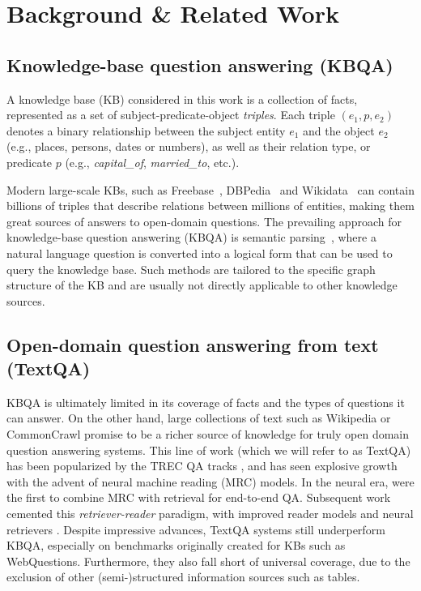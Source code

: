 \documentclass[11pt]{article}
\begin{document}
 
\section{Background \& Related Work}

\subsection{Knowledge-base question answering (KBQA)}

A knowledge base (KB) considered in this work is a collection of facts, represented as a set of subject-predicate-object \emph{triples}.
Each triple $(e_1, p, e_2)$ denotes a binary relationship between the subject entity $e_1$ and the object $e_2$ (e.g., places, persons, dates or numbers), as well as their relation type, or predicate $p$ (e.g., \emph{capital\_of}, \emph{married\_to}, etc.).

Modern large-scale KBs, such as Freebase~\citep{bollacker2008freebase}, DBPedia~\citep{auer2007dbpedia} and Wikidata~\citep{vrandevcic2014wikidata} can contain billions of triples that describe relations between millions of entities, 
making them great sources of answers to open-domain questions.
The prevailing approach for knowledge-base question answering (KBQA) is semantic parsing~\citep{WebQ, yih2015semantic}, where a natural language question is converted into a logical form that can be used to query the knowledge base.
Such methods are tailored to the specific graph structure of the KB and are usually not directly applicable to other knowledge sources.


\subsection{Open-domain question answering from text (TextQA)}
KBQA is ultimately limited in its coverage of facts and the types of questions it can answer.  On the other hand, large collections of text such as Wikipedia or CommonCrawl promise to be a richer source of knowledge for truly open domain question answering systems.  This line of work (which we will refer to as TextQA) has been popularized by the TREC QA tracks \citep{voorhees-tice-2000-trec}, and has seen explosive growth with the advent of neural machine reading (MRC) \citep{rajpurkar-etal-2016-squad} models.  In the neural era, \citet{drqa} were the first to combine MRC with retrieval for end-to-end QA.  Subsequent work cemented this \emph{retriever-reader} paradigm, with improved reader models \citep{yang2019end, izacard-grave-2021-leveraging} and neural retrievers \citep{ORQA, REALM, DPR}.  Despite impressive advances, TextQA systems still underperform KBQA, especially on benchmarks originally created for KBs such as WebQuestions.  
Furthermore, they also fall short of universal coverage, due to the exclusion of other (semi-)structured information sources such as tables.
\end{document}
